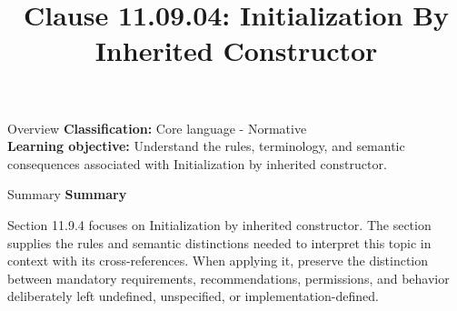 \documentclass[10pt,letterpaper]{article}
\title{Clause 11.09.04: Initialization By Inherited Constructor}
\author{}
\date{}
\begin{document}
\maketitle
\begin{CornellOverviewBox}{Overview}
\textbf{Classification:} Core language - Normative\\[2pt]
\textbf{Learning objective:} Understand the rules, terminology, and semantic consequences associated with Initialization by inherited constructor.
\end{CornellOverviewBox}\begin{CornellSummaryBox}{Summary}
{\sffamily\bfseries\color{Accent} Summary}\par\vspace{3pt}Section 11.9.4 focuses on Initialization by inherited constructor. The section supplies the rules and semantic distinctions needed to interpret this topic in context with its cross-references. When applying it, preserve the distinction between mandatory requirements, recommendations, permissions, and behavior deliberately left undefined, unspecified, or implementation-defined.
\end{CornellSummaryBox}
\end{document}
